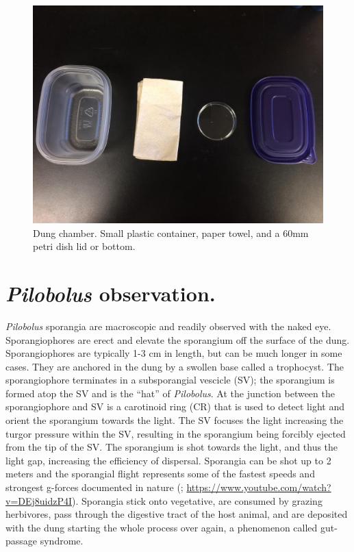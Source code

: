 \documentclass[]{book}
\begin{document}
\begin{figure}

{\centering \includegraphics{img/Ch9_Fig2} 

}

\caption{Dung chamber.  Small plastic container, paper towel, and a 60mm petri dish lid or bottom.}\label{fig:ch9fig2}
\end{figure}

\hypertarget{pilobolus-observation.}{%
\section{\texorpdfstring{\emph{Pilobolus} observation.}{Pilobolus observation.}}\label{pilobolus-observation.}}

\emph{Pilobolus} sporangia are macroscopic and readily observed with the naked eye. Sporangiophores are erect and elevate the sporangium off the surface of the dung. Sporangiophores are typically 1-3 cm in length, but can be much longer in some cases. They are anchored in the dung by a swollen base called a trophocyst. The sporangiophore terminates in a subsporangial vescicle (SV); the sporangium is formed atop the SV and is the ``hat'' of \emph{Pilobolus}. At the junction between the sporangiophore and SV is a carotinoid ring (CR) that is used to detect light and orient the sporangium towards the light. The SV focuses the light increasing the turgor pressure within the SV, resulting in the sporangium being forcibly ejected from the tip of the SV. The sporangium is shot towards the light, and thus the light gap, increasing the efficiency of dispersal. Sporangia can be shot up to 2 meters and the sporangial flight represents some of the fastest speeds and strongest g-forces documented in nature (\citet{Yafetto_2008}; \url{https://www.youtube.com/watch?v=DEj8uidzP4I}). Sporangia stick onto vegetative, are consumed by grazing herbivores, pass through the digestive tract of the host animal, and are deposited with the dung starting the whole process over again, a phenomenon called gut-passage syndrome.
\end{document}
